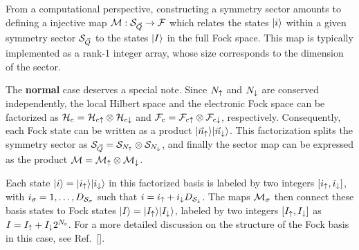 \documentclass[edipack2.tex]{subfiles}
\begin{document}
From a computational perspective, constructing a symmetry
sector amounts to defining a injective map
${\cal M}:{\cal S}_{\vec{Q}}\rightarrow {\cal F}$ which relates the states $|i\rangle$
within a given symmetry sector ${\cal S}_{\vec{Q}}$ to the states $|I\rangle$ in the
full Fock space.
This map is typically implemented as a rank-1
integer array, whose size corresponds to the dimension of the sector. 


The {\bf normal} case deserves a special note. Since $N_\uparrow$ and
$N_\downarrow$ are conserved independently, the local Hilbert
space and the electronic Fock space can be factorized as
${\cal H}_e={\cal H}_{e\uparrow}\otimes{\cal H}_{e\downarrow}$ and ${\cal F}_\mathrm{e} = {\cal F}_{e\uparrow}\otimes {\cal F}_{e\downarrow}$, respectively.  
Consequently, each Fock state can be written as a product
$|\vec{n}_\uparrow\rangle |\vec{n}_\downarrow\rangle$. This factorization splits the
symmetry sector as ${\cal S}_{\vec{Q}} = {\cal S}_{N_\uparrow}\otimes{\cal S}_{N_\downarrow}$,
and finally the sector map can be expressed as the product ${\cal M} = {\cal M}_\uparrow
\otimes {\cal M}_\downarrow$.

Each state $|i\rangle=|i_\uparrow\rangle |i_\downarrow\rangle$ in this factorized basis
is labeled by two integers $[i_\uparrow,i_\downarrow]$, with 
$i_\sigma=1,\dots,D_{{\cal S}_\sigma}$ such that $i=i_\uparrow + i_\downarrow
D_{{\cal S}_\downarrow}$.
The maps ${\cal M}_\sigma$ then connect these basis states to Fock states
$|I\rangle=|I_\uparrow\rangle|I_\downarrow\rangle$, labeled by two integers
$[I_\uparrow,I_\downarrow]$ as $I=I_\uparrow +   I_\downarrow 2^{N_\mathrm{s}}$.
For a more
detailed discussion on the structure of the Fock basis in this case, see Ref.~[]. 
\end{document}
